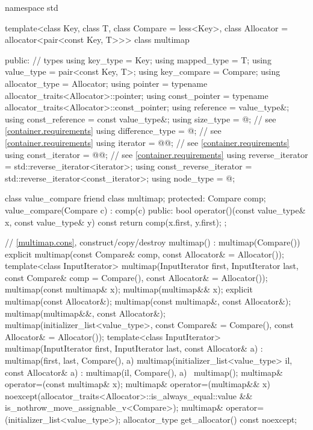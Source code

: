 %
%
\begin{codeblock}
namespace std {
  template<class Key, class T, class Compare = less<Key>,
           class Allocator = allocator<pair<const Key, T>>>
  class multimap {
  public:
    // types
    using key_type               = Key;
    using mapped_type            = T;
    using value_type             = pair<const Key, T>;
    using key_compare            = Compare;
    using allocator_type         = Allocator;
    using pointer                = typename allocator_traits<Allocator>::pointer;
    using const_pointer          = typename allocator_traits<Allocator>::const_pointer;
    using reference              = value_type&;
    using const_reference        = const value_type&;
    using size_type              = @\impdef@; // see \ref{container.requirements}
    using difference_type        = @\impdef@; // see \ref{container.requirements}
    using iterator               = @@; // see \ref{container.requirements}
    using const_iterator         = @@; // see \ref{container.requirements}
    using reverse_iterator       = std::reverse_iterator<iterator>;
    using const_reverse_iterator = std::reverse_iterator<const_iterator>;
    using node_type              = @\unspec@;

    class value_compare {
      friend class multimap;
    protected:
      Compare comp;
      value_compare(Compare c) : comp(c) { }
    public:
      bool operator()(const value_type& x, const value_type& y) const {
        return comp(x.first, y.first);
      }
    };

    // \ref{multimap.cons}, construct/copy/destroy
    multimap() : multimap(Compare()) { }
    explicit multimap(const Compare& comp, const Allocator& = Allocator());
    template<class InputIterator>
      multimap(InputIterator first, InputIterator last,
               const Compare& comp = Compare(),
               const Allocator& = Allocator());
    multimap(const multimap& x);
    multimap(multimap&& x);
    explicit multimap(const Allocator&);
    multimap(const multimap&, const Allocator&);
    multimap(multimap&&, const Allocator&);
    multimap(initializer_list<value_type>,
      const Compare& = Compare(),
      const Allocator& = Allocator());
    template<class InputIterator>
      multimap(InputIterator first, InputIterator last, const Allocator& a)
        : multimap(first, last, Compare(), a) { }
    multimap(initializer_list<value_type> il, const Allocator& a)
      : multimap(il, Compare(), a) { }
    ~multimap();
    multimap& operator=(const multimap& x);
    multimap& operator=(multimap&& x)
      noexcept(allocator_traits<Allocator>::is_always_equal::value &&
               is_nothrow_move_assignable_v<Compare>);
    multimap& operator=(initializer_list<value_type>);
    allocator_type get_allocator() const noexcept;

}}
\end{codeblock}
